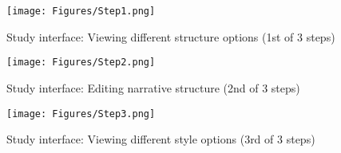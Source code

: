 
\begin{figure}
    \centering
    \texttt{[image: Figures/Step1.png]}
    \caption{Study interface: Viewing different structure options (1st of 3 steps)}
    \label{fig:step1}
\end{figure}

\begin{figure}
    \centering
    \texttt{[image: Figures/Step2.png]}
    \caption{Study interface: Editing narrative structure (2nd of 3 steps)}
    \label{fig:step2}
\end{figure}

\begin{figure}
    \centering
    \texttt{[image: Figures/Step3.png]}
    \caption{Study interface: Viewing different style options (3rd of 3 steps)}
    \label{fig:step3}
\end{figure}














